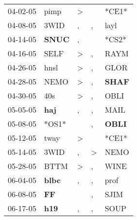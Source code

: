 \begin{supertabular}{p{0.07\textwidth}p{0.06\textwidth}p{0.02\textwidth}p{0.02\textwidth}p{0.06\textwidth}}
          04-02-05\textsuperscript{} &           pimp\textsuperscript{} &     \textgreater &               &                            *CE1* \\
          04-08-05\textsuperscript{} &           3WID\textsuperscript{} &                , &             , &           layl\textsuperscript{} \\
          04-14-05\textsuperscript{} &  \textbf{SNUC\textsuperscript{}} &                , &               &                            *CS2* \\
          04-16-05\textsuperscript{} &           SELF\textsuperscript{} &     \textgreater &             , &           RAYM\textsuperscript{} \\
          04-26-05\textsuperscript{} &           hnsl\textsuperscript{} &     \textgreater &             , &           GLOR\textsuperscript{} \\
          04-28-05\textsuperscript{} &           NEMO\textsuperscript{} &     \textgreater &             , &  \textbf{SHAF\textsuperscript{}} \\
          04-30-05\textsuperscript{} &            40s\textsuperscript{} &     \textgreater &             , &           OBLI\textsuperscript{} \\
          05-05-05\textsuperscript{} &   \textbf{haj\textsuperscript{}} &                , &             , &           MAIL\textsuperscript{} \\
          05-08-05\textsuperscript{} &                            *OS1* &                  &             , &  \textbf{OBLI\textsuperscript{}} \\
          05-12-05\textsuperscript{} &           tway\textsuperscript{} &     \textgreater &               &                            *CE1* \\
          05-14-05\textsuperscript{} &           3WID\textsuperscript{} &                , &  \textgreater &           NEMO\textsuperscript{} \\
          05-28-05\textsuperscript{} &           BTTM\textsuperscript{} &     \textgreater &             , &           WINE\textsuperscript{} \\
          06-04-05\textsuperscript{} &  \textbf{blbc\textsuperscript{}} &                , &             , &           prof\textsuperscript{} \\
          06-08-05\textsuperscript{} &    \textbf{FF\textsuperscript{}} &                  &             , &           SJIM\textsuperscript{} \\
          06-17-05\textsuperscript{} &   \textbf{h19\textsuperscript{}} &                , &             , &           SOUP\textsuperscript{} \\

\end{supertabular}
